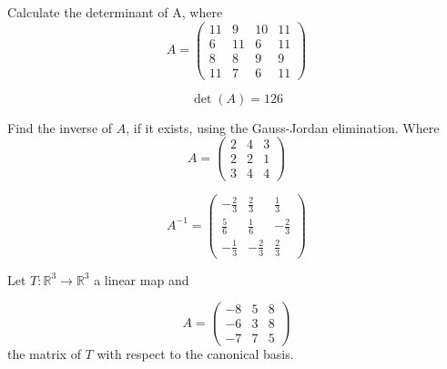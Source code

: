 \begin{questions}

\question Calculate the determinant of A, where
$$
A=\left(\begin{array}{rrrr}
11 & 9 & 10 & 11 \\
6 & 11 & 6 & 11 \\
8 & 8 & 9 & 9 \\
11 & 7 & 6 & 11
\end{array}\right)
$$

\begin{solution}
$$\det(A)=126$$
\end{solution}

\question Find the inverse of $A$, if it exists, using the Gauss-Jordan elimination. Where
$$
A=\left(\begin{array}{rrr}
2 & 4 & 3 \\
2 & 2 & 1 \\
3 & 4 & 4
\end{array}\right)
$$

\begin{solution}
$$A^{-1}=\left(\begin{array}{rrr}
-\frac{2}{3} & \frac{2}{3} & \frac{1}{3} \\
\frac{5}{6} & \frac{1}{6} & -\frac{2}{3} \\
-\frac{1}{3} & -\frac{2}{3} & \frac{2}{3}
\end{array}\right)$$
\end{solution}

\question Let $T:\mathbb{R}^3\rightarrow\mathbb{R}^3$  a linear map and
 
$$
A=\left(\begin{array}{rrr}
-8 & 5 & 8 \\
-6 & 3 & 8 \\
-7 & 7 & 5
\end{array}\right)
$$
the matrix of $T$ with respect to the canonical basis.
\end{questions}
